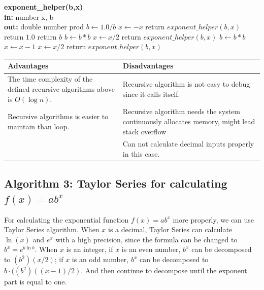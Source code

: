 \documentclass[11pt]{article}
\begin{document}
\begin{algorithm}
  \begin{algorithmic}[1]
   \Function\textbf{\textbf{exponent\_helper(b,x)}}\\
   \textbf{in: }number x, b\\
   \textbf{out: }double number prod
   \State $b \gets 1.0 / b$
   \State $x \gets -x$ 
   \State return $exponent\_helper(b, x)$ 
     \State return $1.0$
    \State return $b$
    \State $b \gets b * b$ 
    \State $x \gets x / 2$ 
    \State return $exponent\_helper(b, x)$
    \Else
    \State $b \gets b * b$ 
    \State $x \gets x - 1$ 
    \State $x \gets x / 2$ 
    \State return $exponent\_helper(b, x)$
    \EndIf 
   \EndFunction
  \end{algorithmic}
\end{algorithm}

\begin{center}
\begin{tabular}{|p{7cm}|p{7cm}|}
\hline
     \textbf{Advantages} & \textbf{Disadvantages}\\ \hline
     The time complexity of the defined recursive algorithms above is $O(\log n)$. & Recursive algorithm is not easy to debug since it calls itself.\\ \hline
     Recursive algorithms is easier to maintain than loop\cite{karigl1981recursive}. & Recursive algorithm needs the system continuously allocates memory, might lead stack overflow\cite{haberman2002case} \\ \hline
      & Can not calculate decimal inputs properly in this case.\\ \hline
\end{tabular}
\end{center}

\subsection{Algorithm 3: Taylor Series for calculating $f(x) = ab^x$}
For calculating the exponential function $f(x) = ab^x$ more properly, we can use Taylor Series algorithm. When $x$ is a decimal, Taylor Series can calculate $\ln(x)$ and $e^x$ with a high precision, since the formula can be changed to $b^x = e^{b\ln b}$. When $x$ is an integer, if $x$ is an even number, $b^x$ can be decomposed to $(b^2) (x/2)$; if $x$ is an odd number, $b^x$ can be decomposed to $b\cdot ((b^2) ((x-1)/2)$. And then continue to decompose until the exponent part is equal to one\cite{abad2012algorithm}.
\end{document}
